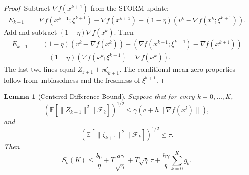 \documentclass[letter,11pt]{article}
\newtheorem{lemma}[]{Lemma}
\newcommand{\E}{\mathbb{E}}
\newcommand{\cF}{\mathcal{F}}
\begin{document}
\begin{proof}
Subtract \(\nabla f(x^{k+1})\) from the STORM update:
\[
\begin{aligned}
    E_{k+1}
    &=
    \nabla f(x^{k+1};\xi^{k+1})
    -
    \nabla f(x^{k+1})
    +(1-\eta)
    \left(
        v^k-\nabla f(x^k;\xi^{k+1})
    \right).
\end{aligned}
\]
Add and subtract \((1-\eta)\nabla f(x^k)\). Then
\[
\begin{aligned}
    E_{k+1}
    &=
    (1-\eta)
    \left(v^k-\nabla f(x^k)\right)
    +
    \left(
        \nabla f(x^{k+1};\xi^{k+1})
        -
        \nabla f(x^{k+1})
    \right) \\
    &\quad
    -
    (1-\eta)
    \left(
        \nabla f(x^k;\xi^{k+1})
        -
        \nabla f(x^k)
    \right).
\end{aligned}
\]
The last two lines equal \(Z_{k+1}+\eta\zeta_{k+1}\). The conditional
mean-zero properties follow from unbiasedness and the freshness of
\(\xi^{k+1}\).
\end{proof}

\begin{lemma}[Centered Difference Bound]
\label{lem:app_nstorm_peeling}
Suppose that for every \(k=0,\ldots,K\),
\[
    \left(
        \E[\|Z_{k+1}\|^2\mid\cF_k]
    \right)^{1/2}
    \le
    \gamma
    \left(
        a+h\|\nabla f(x^k)\|
    \right),
\]
and
\[
    \left(
        \E[\|\zeta_{k+1}\|^2\mid\cF_k]
    \right)^{1/2}
    \le
    \tau.
\]
Then
\begin{equation}
\label{eq:app_nstorm_Sb_generic}
    S_b(K)
    \le
    \frac{b_0}{\eta}
    +
    T\frac{a\gamma}{\sqrt\eta}
    +
    T\sqrt\eta\,\tau
    +
    \frac{h\gamma}{\eta}
    \sum_{k=0}^K g_k.
\end{equation}
\end{lemma}
\end{document}
